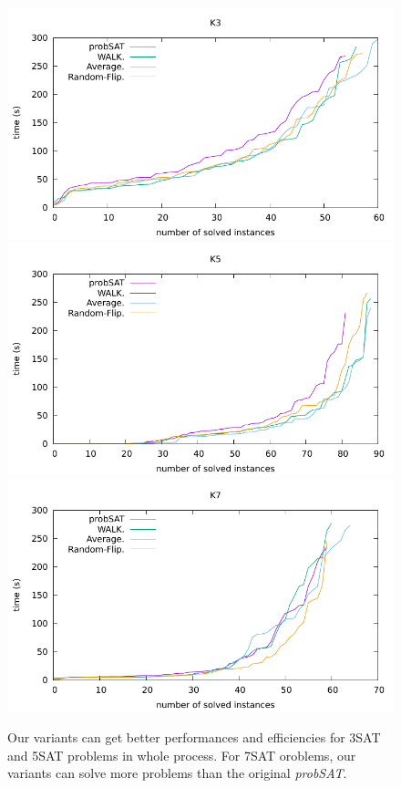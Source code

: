 \documentclass[12pt,a4paper,twoside]{scrartcl}
\numberwithin{equation}{section}
\begin{document}
  \begin{figure}[H]
\begin{center}
  \includegraphics[scale = 0.8]{DATA/K3/e4.pdf}
    \includegraphics[scale = 0.8]{DATA/K5/e4.pdf}
  \includegraphics[scale = 0.8]{DATA/K7/e4.pdf}
  \end{center}
  \label{Experiment 9 k3 cactus plot}
  \end{figure}
  \begin{figure}[H]
\begin{center}

  \end{center}
  \caption{Our variants can get better performances and efficiencies for 3SAT and 5SAT problems in whole process. For 7SAT oroblems, our variants can solve more problems than the original \emph{probSAT}. }
  \label{Experiment 9 k5 cactus plot}
  \end{figure}
  \clearpage
\end{document}
